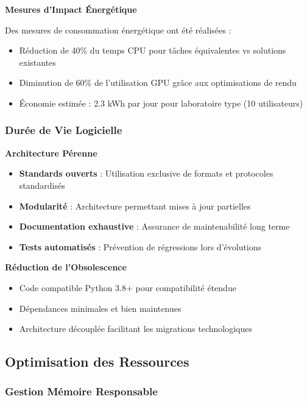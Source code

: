 \documentclass[12pt,a4paper]{report}
\begin{document}
\textbf{Mesures d'Impact Énergétique}

Des mesures de consommation énergétique ont été réalisées :
\begin{itemize}
\item Réduction de 40\% du temps CPU pour tâches équivalentes vs solutions existantes
\item Diminution de 60\% de l'utilisation GPU grâce aux optimisations de rendu
\item Économie estimée : 2.3 kWh par jour pour laboratoire type (10 utilisateurs)
\end{itemize}

\subsubsection{Durée de Vie Logicielle}

\textbf{Architecture Pérenne}
\begin{itemize}
\item \textbf{Standards ouverts} : Utilisation exclusive de formats et protocoles standardisés
\item \textbf{Modularité} : Architecture permettant mises à jour partielles
\item \textbf{Documentation exhaustive} : Assurance de maintenabilité long terme
\item \textbf{Tests automatisés} : Prévention de régressions lors d'évolutions
\end{itemize}

\textbf{Réduction de l'Obsolescence}
\begin{itemize}
\item Code compatible Python 3.8+ pour compatibilité étendue
\item Dépendances minimales et bien maintenues
\item Architecture découplée facilitant les migrations technologiques
\end{itemize}

\subsection{Optimisation des Ressources}

\subsubsection{Gestion Mémoire Responsable}
\end{document}
